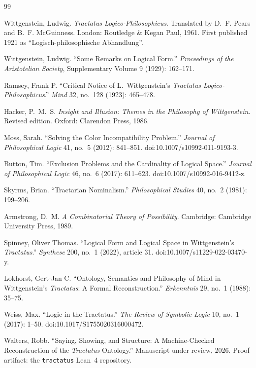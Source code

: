 \documentclass[10pt, letterpaper]{article}
\theoremstyle{remark}
\newcommand{\lean}[1]{\texttt{#1}}
\begin{document}
\begin{thebibliography}{99}

Wittgenstein, Ludwig. \emph{Tractatus Logico-Philosophicus}. Translated by
D.~F. Pears and B.~F. McGuinness. London: Routledge \& Kegan Paul, 1961.
First published 1921 as ``Logisch-philosophische Abhandlung''.

Wittgenstein, Ludwig. ``Some Remarks on Logical Form.'' \emph{Proceedings of
the Aristotelian Society}, Supplementary Volume 9 (1929): 162--171.

Ramsey, Frank P. ``Critical Notice of L.~Wittgenstein's \emph{Tractatus
Logico-Philosophicus}.'' \emph{Mind} 32, no.~128 (1923): 465--478.

Hacker, P.~M.~S. \emph{Insight and Illusion: Themes in the Philosophy of
Wittgenstein}. Revised edition. Oxford: Clarendon Press, 1986.

Moss, Sarah. ``Solving the Color Incompatibility Problem.'' \emph{Journal of
Philosophical Logic} 41, no.~5 (2012): 841--851.
doi:10.1007/s10992-011-9193-3.

Button, Tim. ``Exclusion Problems and the Cardinality of Logical Space.''
\emph{Journal of Philosophical Logic} 46, no.~6 (2017): 611--623.
doi:10.1007/s10992-016-9412-z.

Skyrms, Brian. ``Tractarian Nominalism.'' \emph{Philosophical Studies} 40,
no.~2 (1981): 199--206.

Armstrong, D.~M. \emph{A Combinatorial Theory of Possibility}. Cambridge:
Cambridge University Press, 1989.

Spinney, Oliver Thomas. ``Logical Form and Logical Space in Wittgenstein's
\emph{Tractatus}.'' \emph{Synthese} 200, no.~1 (2022), article 31.
doi:10.1007/s11229-022-03470-y.

Lokhorst, Gert-Jan C. ``Ontology, Semantics and Philosophy of Mind in
Wittgenstein's \emph{Tractatus}: A Formal Reconstruction.'' \emph{Erkenntnis}
29, no.~1 (1988): 35--75.

Weiss, Max. ``Logic in the Tractatus.'' \emph{The Review of Symbolic Logic}
10, no.~1 (2017): 1--50. doi:10.1017/S1755020316000472.

Walters, Robb. ``Saying, Showing, and Structure: A Machine-Checked
Reconstruction of the \emph{Tractatus} Ontology.'' Manuscript under review,
2026. Proof artifact: the \lean{tractatus} Lean~4 repository.


\end{thebibliography}
\end{document}

